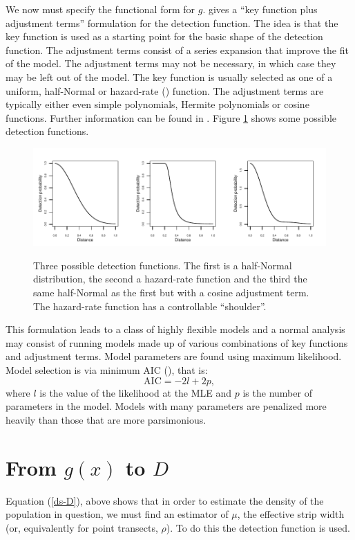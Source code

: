 We now must specify the functional form for $g$.  gives a ``key function plus adjustment terms'' formulation for the detection function. The idea is that the key function is used as a starting point for the basic shape of the detection function. The adjustment terms consist of a series expansion that improve the fit of the model. The adjustment terms may not be necessary, in which case they may be left out of the model. The key function is usually selected as one of a uniform, half-Normal or hazard-rate (\cite{buckland85}) function. The adjustment terms are typically either even simple polynomials, Hermite polynomials or cosine functions. Further information can be found in . Figure \ref{ds-detfct-examples} shows some possible detection functions.

\begin{figure}
\centering
\includegraphics{intro/figs/detfct-examples.pdf}\\
\caption{Three possible detection functions. The first is a half-Normal distribution, the second a hazard-rate function and the third the same half-Normal as the first but with a cosine adjustment term. The hazard-rate function has a controllable ``shoulder''.}
\label{ds-detfct-examples}
\end{figure}

This formulation leads to a class of highly flexible models and a normal analysis may consist of running models made up of various combinations of key functions and adjustment terms. Model parameters are found using maximum likelihood. Model selection is via minimum AIC (\cite[p. 69]{IDS}), that is:
\begin{equation}
\text{AIC} = -2 l + 2p,
\label{DEFN-AIC}
\end{equation}
where $l$ is the value of the likelihood at the MLE and $p$ is the number of parameters in the model. Models with many parameters are penalized more heavily than those that are more parsimonious.

\section{From $g(x)$ to $D$}
\label{gtoD}
Equation (\ref{ds-D}), above shows that in order to estimate the density of the population in question, we must find an estimator of $\mu$, the effective strip width (or, equivalently for point transects, $\rho$). To do this the detection function is used.

